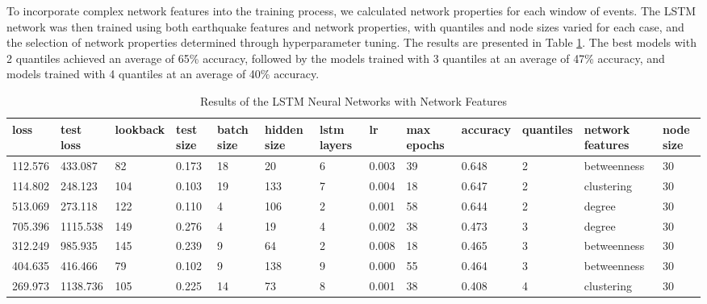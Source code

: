 \documentclass[sn-mathphys-num]{sn-jnl}
\begin{document}
To incorporate complex network features into the training process, we calculated network properties for each window of events. The LSTM network was then trained using both earthquake features and network properties, with quantiles and node sizes varied for each case, and the selection of network properties determined through hyperparameter tuning. The results are presented in Table \ref{tab3}. The best models with 2 quantiles achieved an average of 65\% accuracy, followed by the models trained with 3 quantiles at an average of 47\% accuracy, and models trained with 4 quantiles at an average of 40\% accuracy.

\begin{table}
    \caption{Results of the LSTM Neural Networks with Network Features}\label{tab3}
    
    \begin{tabularx}{\textwidth}{@{}XXXXXXXXXXXll@{}}
        \toprule
        loss     & test loss & lookback & test size & batch size & hidden size & lstm layers & lr    & max epochs & accuracy & quantiles & network features & node size \\
        \midrule
        112.576  & 433.087   & 82       & 0.173     & 18         & 20          & 6           & 0.003 & 39         & 0.648    & 2         & betweenness      & 30        \\
        114.802  & 248.123   & 104      & 0.103     & 19         & 133         & 7           & 0.004 & 18         & 0.647    & 2         & clustering       & 30        \\
        513.069  & 273.118   & 122      & 0.110     & 4          & 106         & 2           & 0.001 & 58         & 0.644    & 2         & degree           & 30        \\
        \midrule
        705.396  & 1115.538  & 149      & 0.276     & 4          & 19          & 4           & 0.002 & 38         & 0.473    & 3         & degree           & 30        \\
        312.249  & 985.935   & 145      & 0.239     & 9          & 64          & 2           & 0.008 & 18         & 0.465    & 3         & betweenness      & 30        \\
        404.635  & 416.466   & 79       & 0.102     & 9          & 138         & 9           & 0.000 & 55         & 0.464    & 3         & betweenness      & 30        \\
        \midrule
        269.973  & 1138.736  & 105      & 0.225     & 14         & 73          & 8           & 0.001 & 38         & 0.408    & 4         & clustering       & 30        \\

\end{tabularx}
\end{table}
\end{document}
